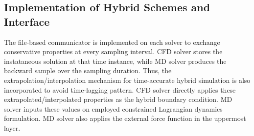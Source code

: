 \documentclass[]{aiaa-tc}%
\begin{document}





\subsection{Implementation of Hybrid Schemes and Interface}
\label{sec:numerics_hybrid}


The file-based communicator is implemented on each solver to exchange conservative
properties at every sampling interval. CFD solver stores the instataneous solution
at that time instance, while MD solver produces the backward sample over the
sampling duration. Thus, the extrapolation/interpolation mechanism for time-accurate
hybrid simulation\cite{JoCS2012} is also incorporated to avoid time-lagging pattern. 
CFD solver directly applies these extrapolated/interpolated properties as the 
hybrid boundary condition. MD solver inputs these values on employed constrained 
Lagrangian dynamics formulation. MD solver also applies the external force function
in the uppermost layer.
\end{document}
